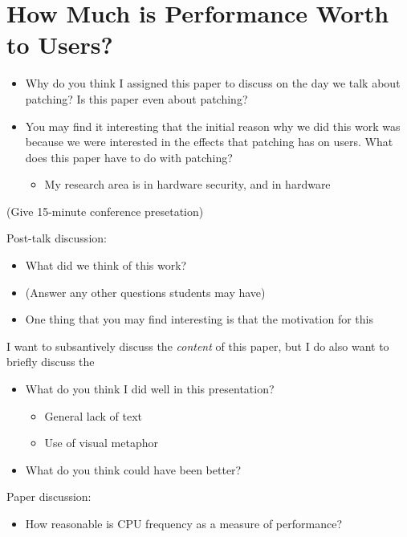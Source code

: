 \documentclass[11pt]{article}
\begin{document}
\section*{How Much is Performance Worth to Users?}

\begin{itemize}
    \item Why do you think I assigned this paper to discuss on the day we talk about patching? Is this paper even about patching?
    \item You may find it interesting that the initial reason why we did this work was because we were interested in the effects that patching has on users. What does this paper have to do with patching?
    \begin{itemize}
        \item My research area is in hardware security, and in hardware 
    \end{itemize}
\end{itemize}

(Give 15-minute conference presetation)

Post-talk discussion:
\begin{itemize}
    \item What did we think of this work?
    \item (Answer any other questions students may have)
    \item One thing that you may find interesting is that the motivation for this 
\end{itemize}

I want to subsantively discuss the {\it content} of this paper, but I do also want to briefly discuss the 
\begin{itemize}
    \item What do you think I did well in this presentation?
    \begin{itemize}
        \item General lack of text
        \item Use of visual metaphor
    \end{itemize}
    \item What do you think could have been better?
\end{itemize}


Paper discussion:
\begin{itemize}
    \item How reasonable is CPU frequency as a measure of performance?
\end{itemize}
\end{document}

